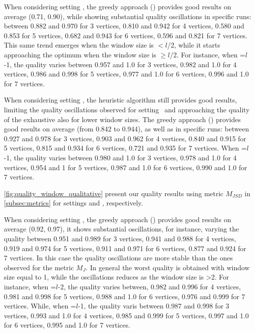   When considering setting \wide, the greedy approach () provides good results on average (0.71, 0.90), while showing substantial quality oscillations in specific runs: between 0.882 and 0.970 for 3 vertices, 0.810 and 0.942 for 4 vertices, 0.580 and 0.853 for 5 vertices, 0.682 and 0.943 for 6 vertices, 0.596 and 0.821 for 7 vertices. This same trend emerges when the window size is $<$$l$/2, while it starts approaching the optimum when the window size is $\geq$$l$/2. For instance, when \windowsize=$l$-1, the quality varies between 0.957 and 1.0 for 3 vertices, 0.982 and 1.0 for 4 vertices, 0.986 and 0.998 for 5 vertices, 0.977 and 1.0 for 6 vertices, 0.996 and 1.0 for 7 vertices.

  When considering setting \average, the heuristic algorithm still provides good results, limiting the quality oscillations observed for setting \wide\ and approaching the quality of the exhaustive also for lower window sizes. The greedy approach () provides good results on average (from 0.842 to 0.944), as well as in specific runs: between 0.927 and 0.978 for 3 vertices, 0.903 and 0.962 for 4 vertices, 0.840 and 0.915 for 5 vertices, 0.815 and 0.934 for 6 vertices, 0.721 and 0.935 for 7 vertices.
  When \windowsize=$l$-1, the quality varies between 0.980 and 1.0 for 3 vertices, 0.978 and 1.0 for 4 vertices, 0.954 and 1 for 5 vertices, 0.987 and 1.0 for 6 vertices, 0.990 and 1.0 for 7 vertices.


  \cref{fig:quality_window_qualitative} present our quality results using metric $M_{JSD}$ in \cref{subsec:metrics} for settings \wide and \average, respectively.

  When considering setting \wide, the greedy approach () provides good results on average (0.92, 0.97), it shows substantial oscillations, for instance, varying the quality between 0.951 and 0.989 for 3 vertices, 0.941 and 0.988 for 4 vertices, 0.919 and 0.974 for 5 vertices, 0.911 and 0.971 for 6 vertices, 0.877 and 0.924 for 7 vertices. In this case the quality oscillations are more stable than the ones observed for the metric $M_J$.
  In general the worst quality is obtained with window size equal to 1, while the oscillations reduces as the window size is >2. For instance, when \windowsize=$l$-2, the quality varies between, 0.982 and 0.996 for 4 vertices, 0.981 and 0.998 for 5 vertices, 0.988 and 1.0 for 6 vertices, 0.976 and 0.999 for 7 vertices.
 While, when \windowsize=$l$-1, the quality varis between  0.987 and  0.998 for 3 vertices, 0.993 and 1.0 for 4 vertices, 0.985 and 0.999 for 5 vertices, 0.997 and 1.0 for 6 vertices, 0.995 and 1.0  for 7 vertices.


